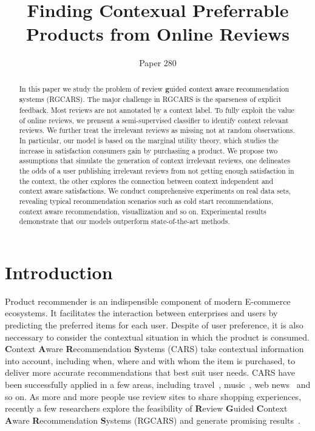 \documentclass[sigconf]{acmart}
\begin{document}
\title{Finding Contexual Preferrable Products from Online Reviews}
\author{Paper 280}



\begin{abstract}
In this paper we study the problem of \textbf{r}eview \textbf{g}uided \textbf{c}ontext \textbf{a}ware \textbf{r}ecommendation \textbf{s}ystems (RGCARS). The major challenge in RGCARS is the sparseness of explicit feedback. Most reviews are not annotated by a context label. To fully exploit the value of online reviews, we prensent a semi-supervised classifier to identify context relevant reviews. We further treat the irrelevant reviews as missing not at random observations. In particular, our model is based on the marginal utility theory, which studies the increase in satisfaction consumers gain by purchasiing a product. We propose two assumptions that simulate the generation of context irrelevant reviews, one delineates the odds of a user publishing irrelevant reviews from not getting enough satisfaction in the context, the other explores the connection between context independent and context aware satisfactions. We conduct comprehensive experiments on real data sets, revealing typical recommendation scenarios such as cold start recommendations, context aware recommendation, visuallization and so on. Experimental results demonstrate that our models outperform state-of-the-art methods. 
\end{abstract}


\maketitle
\section{Introduction}\label{sec:intro}
Product recommender is an indispensible component of modern E-commerce ecosystems. It facilitates the interaction between enterprises and users by predicting the preferred items for each user. Despite of user preference, it is also neccessary to consider the contextual situation in which the product is consumed. \textbf{C}ontext \textbf{A}ware \textbf{R}ecommendation \textbf{S}ystems (CARS) take contextual information into account, including when, where and with whom the item is purchased, to deliver more accurate recommendations that best suit user needs. CARS have been successfully applied in a few areas, including travel~\cite{Biancalana2013Approach}, music~\cite{Cai2007MusicSense}, web news~\cite{Wang2015CROWN} and so on. As more and more people use review sites to share shopping experiences, recently a few researchers explore the feasibility of \textbf{R}eview \textbf{G}uided \textbf{C}ontext \textbf{A}ware \textbf{R}ecommendation \textbf{S}ystems (RGCARS) and generate promising results~\cite{Li2010Contextual,Levi2012Finding,Hariri2013Query,Liu2013Combining}. 
\end{document}
